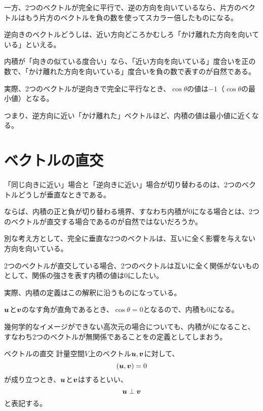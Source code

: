 \documentclass[../../../topic_linear-algebra]{subfiles}
\begin{document}
一方、2つのベクトルが完全に平行で、逆の方向を向いているなら、片方のベクトルはもう片方のベクトルを負の数を使ってスカラー倍したものになる。

\br

逆向きのベクトルどうしは、近い方向どころかむしろ「かけ離れた方向を向いている」といえる。

内積が「向きの似ている度合い」なら、「近い方向を向いている」度合いを正の数で、「かけ離れた方向を向いている」度合いを負の数で表すのが自然である。

\br

実際、2つのベクトルが逆向きで完全に平行なとき、$\cos \theta$の値は$-1$（$\cos\theta$の最小値）となる。

つまり、逆方向に近い「かけ離れた」ベクトルほど、内積の値は最小値に近くなる。

\sectionline
\section{ベクトルの直交}

「同じ向きに近い」場合と「逆向きに近い」場合が切り替わるのは、2つのベクトルどうしが垂直なときである。

ならば、内積の正と負が切り替わる境界、すなわち内積が$0$になる場合とは、2つのベクトルが直交する場合であるのが自然ではないだろうか。

\br

別な考え方として、完全に垂直な2つのベクトルは、互いに全く影響を与えない方向を向いている。

2つのベクトルが直交している場合、2つのベクトルは互いに全く関係がないものとして、関係の強さを表す内積の値は$0$にしたい。

\br

実際、内積の定義はこの解釈に沿うものになっている。

$\vb*{u}$と$\vb*{v}$のなす角が直角であるとき、$\cos \theta = 0$となるので、内積も0になる。

\br

幾何学的なイメージができない高次元の場合についても、内積が0になること、すなわち2つのベクトルが無関係であることをの定義としてしまおう。

\begin{definition*}{ベクトルの直交}
  計量空間$V$上のベクトル$\vb*{u},\vb*{v}$に対して、
  \begin{equation*}
    (\vb*{u}, \vb*{v}) = 0
  \end{equation*}
  が成り立つとき、$\vb*{u}$と$\vb*{v}$はするといい、
  \begin{equation*}
    \vb*{u} \perp \vb*{v}
  \end{equation*}
  と表記する。
\end{definition*}
\end{document}
